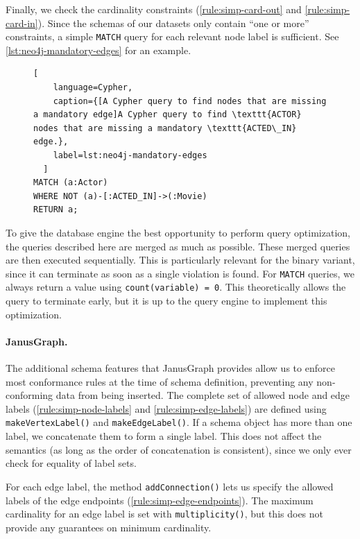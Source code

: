 \documentclass{report}
\theoremstyle{definition}
\begin{document}
Finally, we check the cardinality constraints (\autoref{rule:simp-card-out} and \ref{rule:simp-card-in}). Since the schemas of our datasets only contain ``one or more'' constraints, a simple \texttt{MATCH} query for each relevant node label is sufficient. See \autoref{lst:neo4j-mandatory-edges} for an example.

\begin{figure}[H]
  \begin{lstlisting}[
    language=Cypher,
    caption={[A Cypher query to find nodes that are missing a mandatory edge]A Cypher query to find \texttt{ACTOR} nodes that are missing a mandatory \texttt{ACTED\_IN} edge.},
    label=lst:neo4j-mandatory-edges
  ]
MATCH (a:Actor)
WHERE NOT (a)-[:ACTED_IN]->(:Movie)
RETURN a;
  \end{lstlisting}
\end{figure}

To give the database engine the best opportunity to perform query optimization, the queries described here are merged as much as possible. These merged queries are then executed sequentially. This is particularly relevant for the binary variant, since it can terminate as soon as a single violation is found. For \texttt{MATCH} queries, we always return a value using \texttt{count(variable) = 0}. This theoretically allows the query to terminate early, but it is up to the query engine to implement this optimization.

\paragraph{JanusGraph.} The additional schema features that JanusGraph provides allow us to enforce most conformance rules at the time of schema definition, preventing any non-conforming data from being inserted. The complete set of allowed node and edge labels (\autoref{rule:simp-node-labels} and \ref{rule:simp-edge-labels}) are defined using \texttt{makeVertexLabel()} and \texttt{makeEdgeLabel()}. If a schema object has more than one label, we concatenate them to form a single label. This does not affect the semantics (as long as the order of concatenation is consistent), since we only ever check for equality of label sets.

For each edge label, the method \texttt{addConnection()} lets us specify the allowed labels of the edge endpoints (\autoref{rule:simp-edge-endpoints}). The maximum cardinality for an edge label is set with \texttt{multiplicity()}, but this does not provide any guarantees on minimum cardinality.
\end{document}
